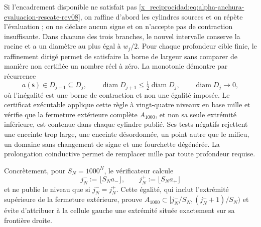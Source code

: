 Si l'encadrement disponible ne satisfait pas \eqref{x_reciprocidad:eq:alpha-anchura-evaluacion-rescate-rev08}, on raffine d'abord les cylindres sources et on répète l'évaluation ; on ne déclare aucun signe et on n'accepte pas de contraction insuffisante. Dans chacune des trois branches, le nouvel intervalle conserve la racine et a un diamètre au plus égal à \(w_j/2\). Pour chaque profondeur cible finie, le raffinement dirigé permet de satisfaire la borne de largeur sans comparer de manière non certifiée un nombre réel à zéro. La monotonie démontre par récurrence
\begin{equation}
 a(\mathsf s)\in D_{j+1}\subseteq D_j,\qquad
 \operatorname{diam}D_{j+1}\leq
 \tfrac12\operatorname{diam}D_j,
 \qquad \operatorname{diam}D_j\longrightarrow0,
 \label{x_reciprocidad:eq:alpha-biseccion-racional}
\end{equation}
où l'inégalité est une borne de contraction et non une égalité imposée.
Le certificat exécutable applique
cette règle à vingt-quatre niveaux en base mille et vérifie que la fermeture
extérieure complète \(A_{1000}\), et non sa seule extrémité inférieure, est contenue dans
chaque cylindre publié. Ses tests négatifs rejettent une enceinte trop
large, une enceinte désordonnée, un point autre que le milieu, un domaine sans
changement de signe et une fourchette dégénérée. La prolongation coinductive permet
de remplacer mille par toute profondeur requise.

Concrètement, pour \(S_N=1000^N\), le vérificateur calcule
\begin{equation}
 j_N^-:=\lfloor S_Na_-\rfloor,
 \qquad j_N^+:=\lfloor S_Na_+\rfloor
 \label{x_reciprocidad:eq:alpha-indices-cilindro-dirigidos-rev08}
\end{equation}
et ne publie le niveau que si \(j_N^-=j_N^+\). Cette égalité, qui inclut
l'extrémité supérieure de la fermeture extérieure, prouve
\(A_{1000}\subset[j_N^-/S_N,(j_N^-+1)/S_N)\) et évite d'attribuer à la cellule
gauche une extrémité située exactement sur sa frontière droite.

